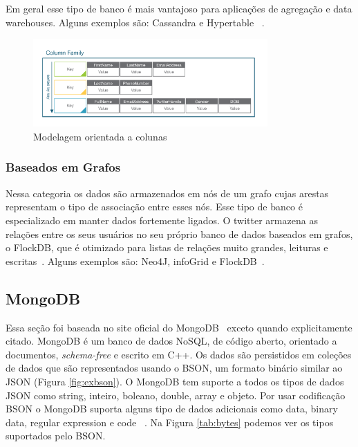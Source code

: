 Em geral esse tipo de banco é mais vantajoso para aplicações de agregação e data warehouses. Alguns exemplos são: Cassandra e  Hypertable ~\cite{nosqldatabaseorg}.



	\begin{figure}[!htbp]
		\begin{center}
			\includegraphics[width=0.8\textwidth]{columns}
		\end{center}
		\caption{Modelagem orientada a colunas}
		\label{fig:mdcolumns}
	\end{figure}


\subsubsection{Baseados em Grafos}

Nessa categoria os dados são armazenados em nós de um grafo cujas arestas representam o tipo de associação entre esses nós. Esse tipo de banco é especializado em manter dados fortemente ligados. O twitter armazena as relações entre os seus usuários no seu próprio banco de dados baseados em grafos, o FlockDB, que é otimizado para listas de relações muito grandes, leituras e escritas~\cite{nosqlevaluation}.  Alguns exemplos são: Neo4J, infoGrid e FlockDB~\cite{nosqldatabaseorg}.

\subsection{MongoDB}\label{sec:mongo}

Essa seção foi baseada no site oficial do MongoDB~\cite{sitemongodb} exceto quando explicitamente citado.
MongoDB é um banco de dados NoSQL,  de código aberto,  orientado a documentos, \textit{schema-free} e escrito em C++.  Os dados são persistidos em coleções de dados que são representados usando o BSON, um formato binário similar ao JSON (Figura \ref{fig:exbson}). O MongoDB tem suporte a todos os tipos de dados  JSON  como string, inteiro, boleano, double, array e objeto. Por usar codificação BSON o MongoDB suporta alguns tipo de dados adicionais como data, binary data, regular expression e code ~\cite{nosqlprofessional}. Na Figura \ref{tab:bytes} podemos ver os tipos suportados pelo BSON.

